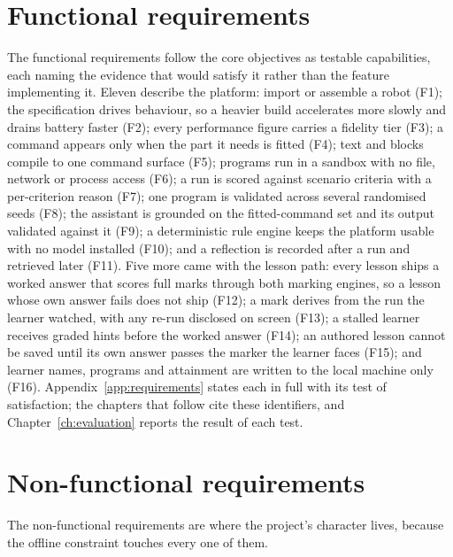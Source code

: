 \documentclass[11pt,a4paper]{report}
\begin{document}
\section{Functional requirements}
The functional requirements follow the core objectives as testable capabilities, each naming the evidence that would satisfy it rather than the feature implementing it. Eleven describe the platform: import or assemble a robot (F1); the specification drives behaviour, so a heavier build accelerates more slowly and drains battery faster (F2); every performance figure carries a fidelity tier (F3); a command appears only when the part it needs is fitted (F4); text and blocks compile to one command surface (F5); programs run in a sandbox with no file, network or process access (F6); a run is scored against scenario criteria with a per-criterion reason (F7); one program is validated across several randomised seeds (F8); the assistant is grounded on the fitted-command set and its output validated against it (F9); a deterministic rule engine keeps the platform usable with no model installed (F10); and a reflection is recorded after a run and retrieved later (F11). Five more came with the lesson path: every lesson ships a worked answer that scores full marks through both marking engines, so a lesson whose own answer fails does not ship (F12); a mark derives from the run the learner watched, with any re-run disclosed on screen (F13); a stalled learner receives graded hints before the worked answer (F14); an authored lesson cannot be saved until its own answer passes the marker the learner faces (F15); and learner names, programs and attainment are written to the local machine only (F16). Appendix~\ref{app:requirements} states each in full with its test of satisfaction; the chapters that follow cite these identifiers, and Chapter~\ref{ch:evaluation} reports the result of each test.

\section{Non-functional requirements}
The non-functional requirements are where the project's character lives, because the offline constraint touches every one of them.
\end{document}
